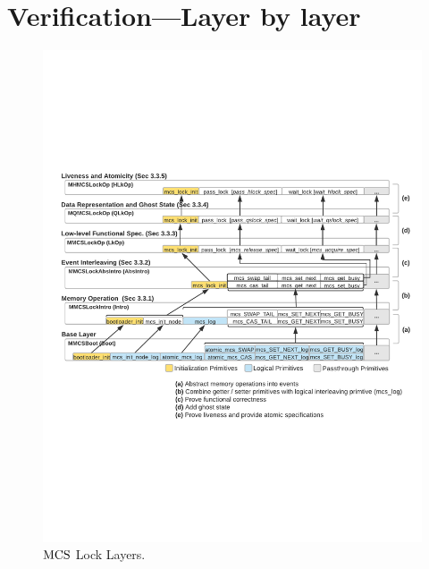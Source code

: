 \section{Verification---Layer by layer}
\label{chapter:mcslock:sec:verification}%

\begin{figure}
\begin{center}
\includegraphics[width=\textwidth]{figs/mcslock/layer_overview}
\end{center}
\caption{$\mathrm{MCS}$ Lock Layers.}
\label{fig:chapter:mcslock:layeroverview}
\end{figure}

